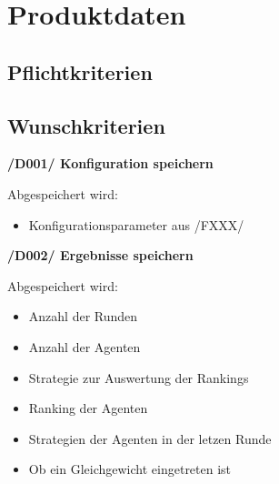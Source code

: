 \section{Produktdaten}

\subsection{Pflichtkriterien}

\subsection{Wunschkriterien}

\textbf{/D001/ Konfiguration speichern}

Abgespeichert wird:
\begin{itemize}
\item Konfigurationsparameter aus /FXXX/
\end{itemize}

\textbf{/D002/ Ergebnisse speichern}	

Abgespeichert wird:
\begin{itemize}
\item Anzahl der Runden
\item Anzahl der Agenten
\item Strategie zur Auswertung der Rankings
\item Ranking der Agenten
\item Strategien der Agenten in der letzen Runde
\item Ob ein Gleichgewicht eingetreten ist
\end{itemize}